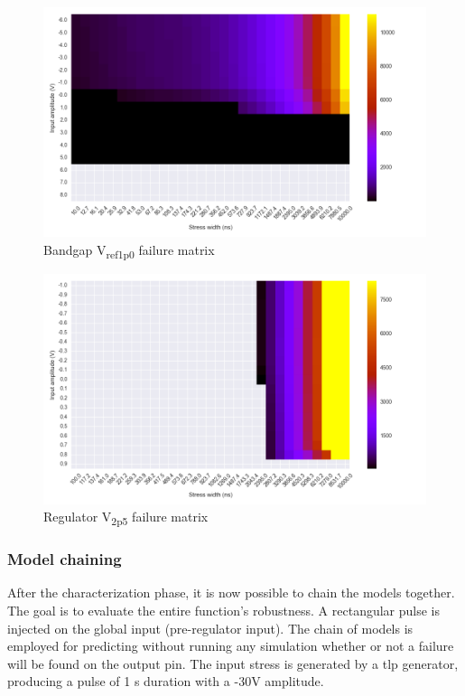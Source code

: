 \begin{figure}[!h]
  \centering
  \includegraphics[width=\textwidth]{src/4/figures/bandgap_cz.png}
  \caption{Bandgap V\textsubscript{ref1p0} failure matrix}
  \label{bandgap_wb}
\end{figure}

\begin{figure}[!h]
  \centering
  \includegraphics[width=\textwidth]{src/4/figures/regulator_cz.png}
  \caption{Regulator V\textsubscript{2p5} failure matrix}
  \label{regu_wb}
\end{figure}

\subsubsection{Model chaining}

After the characterization phase, it is now possible to chain the models together.
The goal is to evaluate the entire function's robustness.
A rectangular pulse is injected on the global input (pre-regulator input).
The chain of models is employed for predicting without running any simulation whether or not a failure will be found on the output pin.
The input stress is generated by a \gls{tlp} generator, producing a pulse of 1 \textmu{}s duration with a -30V amplitude.

